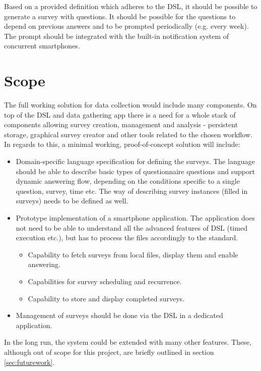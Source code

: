 Based on a provided definition which adheres to the DSL, it should be possible to generate a survey with questions. It should be possible for the questions to depend on previous answers and to be prompted periodically (e.g. every week). The prompt should be integrated with the built-in notification system of concurrent smartphones.

\section{Scope}
\label{sec:scope}
The full working solution for data collection would include many components. On top of the DSL and data gathering app there is a need for a whole stack of components allowing survey creation, management and analysis - persistent storage, graphical survey creator and other tools related to the chosen workflow. In regards to this, a minimal working, proof-of-concept solution will include:

\begin{itemize}
\item Domain-specific language specification for defining the surveys. The language should be able to describe basic types of questionnaire questions and support dynamic answering flow, depending on the conditions specific to a single question, survey, time etc. The way of describing survey instances (filled in surveys) needs to be defined as well.
\item Prototype implementation of a smartphone application. The application does not need to be able to understand all the advanced features of DSL (timed execution etc.), but has to process the files accordingly to the standard.
	\begin{itemize}
		\item Capability to fetch surveys from local files, display them and enable answering.
		\item Capabilities for survey scheduling and recurrence.
		\item Capability to store and display completed surveys.
	\end{itemize}
\item Management of surveys should be done via the DSL in a dedicated application. %
\end{itemize}

In the long run, the system could be extended with many other features. These, although out of scope for this project, are briefly outlined in section \ref{sec:futurework}.

